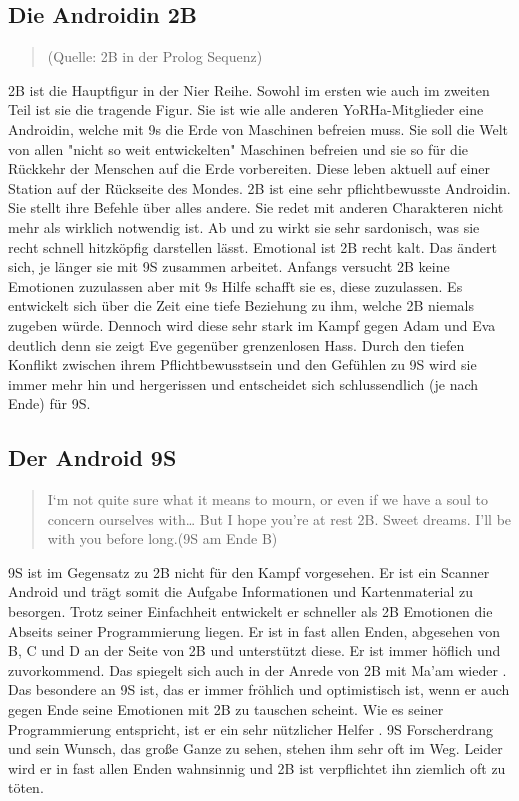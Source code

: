 \subsection{Die Androidin 2B}

\begin{quote}
	(Quelle: 2B in der Prolog Sequenz)
\end{quote}
2B ist die Hauptfigur in der Nier Reihe. Sowohl im ersten wie auch im zweiten Teil ist sie die tragende Figur. Sie ist wie alle anderen YoRHa-Mitglieder eine Androidin, welche mit 9s die Erde von Maschinen befreien muss. Sie soll die Welt von allen "nicht so weit entwickelten" Maschinen befreien und sie so für die Rückkehr der Menschen auf die Erde vorbereiten. Diese leben aktuell auf einer Station auf der Rückseite des Mondes.  2B ist eine sehr pflichtbewusste Androidin. Sie stellt ihre Befehle über alles andere. Sie redet mit anderen Charakteren nicht mehr als wirklich notwendig ist. Ab und zu wirkt sie sehr sardonisch, was sie recht schnell hitzköpfig darstellen lässt. Emotional ist 2B recht kalt. Das ändert sich, je länger sie mit 9S zusammen arbeitet. Anfangs versucht 2B keine Emotionen zuzulassen aber mit 9s Hilfe schafft sie es, diese zuzulassen. Es entwickelt sich über die Zeit eine tiefe Beziehung zu ihm, welche 2B niemals zugeben würde. Dennoch wird diese sehr stark im Kampf gegen \dq Adam und Eva \dq  deutlich denn sie zeigt Eve gegenüber grenzenlosen Hass. Durch den tiefen Konflikt zwischen ihrem Pflichtbewusstsein und den Gefühlen zu 9S wird sie immer mehr hin und hergerissen und entscheidet sich schlussendlich (je nach Ende) für 9S. ~\cite{nier:automatawikia20192b}


\subsection{Der Android 9S}

\begin{quote}
	\dq I‘m not quite sure what it means to mourn, or even if we have a soul to concern ourselves with… But I hope you’re at rest 2B. Sweet dreams. I’ll be with you before long.\dq  \vspace{10px}(9S am Ende B)
\end{quote}
	9S ist im Gegensatz zu 2B nicht für den Kampf vorgesehen. Er ist ein Scanner Android und trägt somit die Aufgabe Informationen und Kartenmaterial zu besorgen. Trotz seiner \dq Einfachheit \dq entwickelt er schneller als 2B Emotionen die Abseits seiner Programmierung liegen. Er ist in fast allen Enden, abgesehen von B, C und D an der Seite von 2B und unterstützt diese. Er ist immer höflich und zuvorkommend. Das spiegelt sich auch in der Anrede von 2B mit \dq Ma'am \dq wieder . Das besondere an 9S ist, das er immer fröhlich und optimistisch ist, wenn er auch gegen Ende seine Emotionen mit 2B zu tauschen scheint. Wie es seiner Programmierung entspricht, ist er ein sehr nützlicher \dq Helfer \dq . 9S Forscherdrang und sein Wunsch, das große Ganze zu sehen, stehen ihm sehr oft im Weg. Leider wird er in fast allen Enden wahnsinnig und 2B ist verpflichtet ihn ziemlich oft zu töten. ~\cite{nier:automatawikia20199S}

